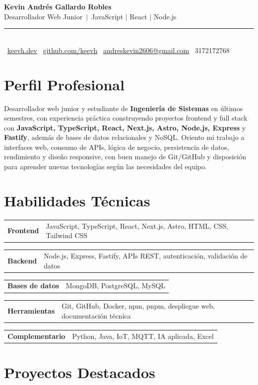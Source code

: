 \documentclass[a4paper,10.5pt]{article}
\makeatletter
\newcommand{\skillrow}[2]{%
  \noindent\begin{tabularx}{\textwidth}{@{}p{3.1cm}@{}X@{}}
    \textbf{\color{ink}#1} & #2
  \end{tabularx}\par\vspace{2pt}
}
\makeatother
\begin{document}
{\fontsize{26}{30}\selectfont\bfseries\color{ink} Kevin Andrés Gallardo Robles}\\[3pt]
{\color{accent}\large Desarrollador Web Junior\, \textcolor{muted}{$|$}\, JavaScript \textcolor{muted}{$|$} React \textcolor{muted}{$|$} Node.js}\\[6pt]
{\color{rule}\rule{\textwidth}{1pt}}\\[5pt]
{\small
\faGlobe~\href{https://keevh.dev/}{keevh.dev}\quad
\faGithub~\href{https://github.com/keevh}{github.com/keevh}\quad
\faEnvelope~\href{mailto:andreskevin2606@gmail.com}{andreskevin2606@gmail.com}\quad
\faWhatsapp~3172172768
}

\section{Perfil Profesional}
\small
Desarrollador web junior y estudiante de \textbf{Ingeniería de Sistemas} en últimos semestres,
con experiencia práctica construyendo proyectos frontend y full stack con \textbf{JavaScript,
TypeScript, React, Next.js, Astro, Node.js, Express} y \textbf{Fastify}, además de bases de
datos relacionales y NoSQL. Oriento mi trabajo a interfaces web, consumo de APIs, lógica de
negocio, persistencia de datos, rendimiento y diseño responsive, con buen manejo de
Git/GitHub y disposición para aprender nuevas tecnologías según las necesidades del equipo.

\section{Habilidades Técnicas}
\small
\skillrow{Frontend}{JavaScript, TypeScript, React, Next.js, Astro, HTML, CSS, Tailwind CSS}
\skillrow{Backend}{Node.js, Express, Fastify, APIs REST, autenticación, validación de datos}
\skillrow{Bases de datos}{MongoDB, PostgreSQL, MySQL}
\skillrow{Herramientas}{Git, GitHub, Docker, npm, pnpm, despliegue web, documentación técnica}
\skillrow{Complementario}{Python, Java, IoT, MQTT, IA aplicada, Excel}

\section{Proyectos Destacados}
\end{document}
